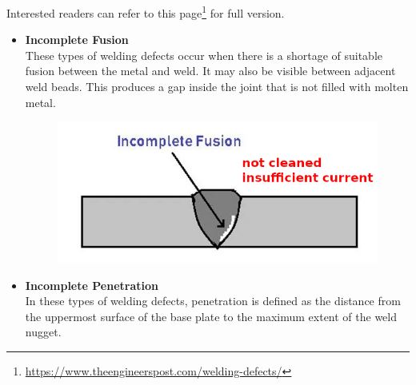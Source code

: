 Interested readers can refer to this page\footnote{\url{https://www.theengineerspost.com/welding-defects/}} for full version.
\begin{itemize}
\item \textbf{Incomplete Fusion}\\These types of welding defects occur when there is a shortage of suitable fusion between the metal and weld. It may also be visible between adjacent weld beads. This produces a gap inside the joint that is not filled with molten metal.
\begin{figure}[H]
\centering
\includegraphics[scale=.3]{PIC/CH07/IF}
\end{figure}
\item \textbf{Incomplete Penetration}\\In these types of welding defects, penetration is defined as the distance from the uppermost surface of the base plate to the maximum extent of the weld nugget.


\end{itemize}
